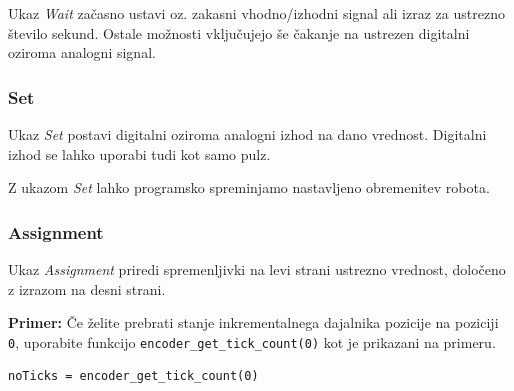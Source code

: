 Ukaz \emph{Wait} začasno ustavi oz. zakasni vhodno/izhodni signal ali izraz za ustrezno število sekund. Ostale možnosti vključujejo še čakanje na ustrezen digitalni oziroma analogni signal.


\subsubsection{Set}

Ukaz \emph{Set} postavi digitalni oziroma analogni izhod na dano vrednost. Digitalni izhod se lahko uporabi tudi kot samo pulz.

Z ukazom \emph{Set} lahko programsko spreminjamo nastavljeno obremenitev robota.


%
%
\subsubsection{Assignment}

Ukaz \emph{Assignment} priredi spremenljivki na levi strani ustrezno vrednost, določeno z izrazom na desni strani.

\begin{mdframed}[backgroundcolor=yellow!10, shadow=true,roundcorner=8pt]
\textbf{Primer:} Če želite prebrati stanje inkrementalnega dajalnika pozicije na poziciji \verb"0", uporabite funkcijo \verb"encoder_get_tick_count(0)" kot je prikazani na primeru.
\begin{verbatim}
noTicks = encoder_get_tick_count(0)
\end{verbatim}
\end{mdframed}





